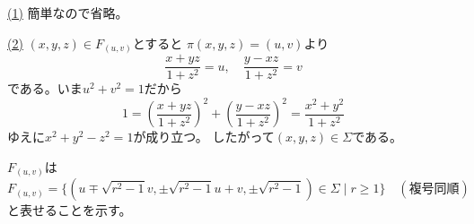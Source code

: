 \documentclass[report]{jlreq}
\begin{document}
\begin{answer}
    \uline{(1)} \quad
    簡単なので省略。

    \uline{(2)} \quad
    $(x, y, z) \in F_{(u, v)}$とすると
    $\pi(x, y, z) = (u, v)$より
    \begin{equation}
        \frac{x + yz}{1 + z^2} = u,
        \quad
        \frac{y - xz}{1 + z^2} = v
    \end{equation}
    である。いま$u^2 + v^2 = 1$だから
    \begin{equation}
        1
            = \left(\frac{x + yz}{1 + z^2}\right)^2
            + \left(\frac{y - xz}{1 + z^2}\right)^2
            = \frac{x^2 + y^2}{1 + z^2}
    \end{equation}
    ゆえに$x^2 + y^2 - z^2 = 1$が成り立つ。
    したがって$(x, y, z) \in \Sigma$である。

    $F_{(u, v)}$は
    \begin{equation}
        F_{(u, v)}
            = \{
                (
                    u \mp \sqrt{r^2 - 1} v,
                    \pm \sqrt{r^2 - 1} u + v,
                    \pm \sqrt{r^2 - 1}
                )
                \in \Sigma
                \mid
                r \ge 1
            \}
            \quad
            (\text{複号同順})
    \end{equation}
    と表せることを示す。


\end{answer}
\end{document}
